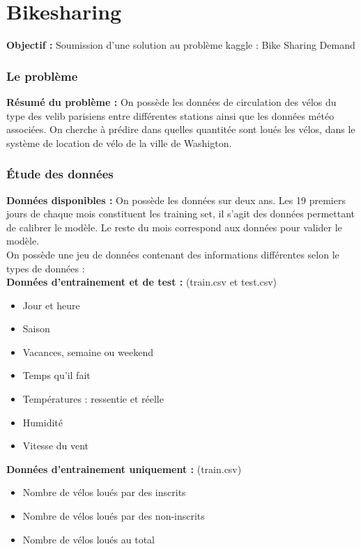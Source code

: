 \part{Bikesharing}

\textbf{Objectif :} Soumission d'une solution au problème kaggle : Bike Sharing Demand
\\

\section{Le problème}

\textbf{Résumé du problème :} On possède les données de circulation des vélos du type des velib parisiens entre différentes stations ainsi que les données météo associées. On cherche à prédire dans quelles quantitée sont loués les vélos, dans le système de location de vélo de la ville de Washigton.
\\

\section{Étude des données}

\textbf{Données disponibles :} On possède les données sur deux ans. Les 19 premiers jours de chaque mois constituent les training set, il s'agit des données permettant de calibrer le modèle. Le reste du mois correspond aux données pour valider le modèle.
\\

On possède une jeu de données contenant des informations différentes selon le types de données :\\

\textbf{Données d'entrainement et de test : } (train.csv et test.csv)

\begin{itemize}[label=$\circ$]
\item Jour et heure
\item Saison
\item Vacances, semaine ou weekend
\item Temps qu'il fait
\item Températures : ressentie et réelle
\item Humidité
\item Vitesse du vent
\end{itemize}

\textbf{Données d'entrainement uniquement : } (train.csv)

\begin{itemize}[label=$\circ$]
\item Nombre de vélos loués par des inscrits
\item Nombre de vélos loués par des non-inscrits
\item Nombre de vélos loués au total
\end{itemize}

